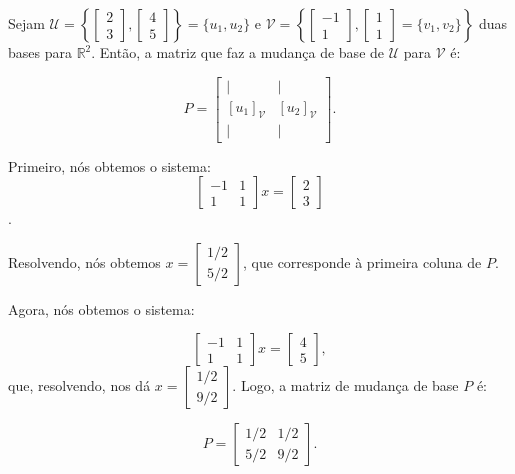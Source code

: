 \begin{Example}
	Sejam $\mathcal{U} = \left\{\begin{bmatrix}
		2 \\
		3
	\end{bmatrix}, \begin{bmatrix}
		4 \\
		5
	\end{bmatrix}\right\} = \{u_1, u_2\}$ e $\mathcal{V} = \left\{\begin{bmatrix}
		-1 \\
		1
	\end{bmatrix}, \begin{bmatrix}
		1 \\
		1
	\end{bmatrix} = \{v_1, v_2\}\right\}$ duas bases para $\mathbb{R}^2$. Então, a matriz que faz a mudança de base de $\mathcal{U}$ para $\mathcal{V}$ é:
	
	$$
	P = \begin{bmatrix}
		| & | \\
		[u_1]_\mathcal{V} & [u_2]_\mathcal{V} \\
		| & |
	\end{bmatrix}.
	$$
	
	Primeiro, nós obtemos o sistema:
	$$
	\begin{bmatrix}
		-1 & 1 \\
		1 & 1
	\end{bmatrix}x = \begin{bmatrix}
		2 \\
		3
	\end{bmatrix}
	$$.
	
	Resolvendo, nós obtemos $x = \begin{bmatrix}
		1/2 \\
		5/2
	\end{bmatrix}$, que corresponde à primeira coluna de $P$. 
	
	Agora, nós obtemos o sistema:
	
	$$
	\begin{bmatrix}
		-1 & 1 \\
		1 & 1
	\end{bmatrix}x = \begin{bmatrix}
		4 \\
		5
	\end{bmatrix},
	$$
	que, resolvendo, nos dá $x = \begin{bmatrix}
		1/2 \\
		9/2
	\end{bmatrix}$. Logo, a matriz de mudança de base $P$ é:
	
	$$
	P = \begin{bmatrix}
		1/2 & 1/2 \\
		5/2 & 9/2
	\end{bmatrix}.
	$$
\end{Example}

